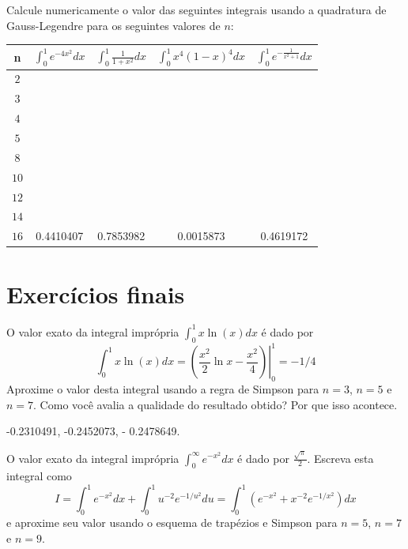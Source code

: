 \begin{Exercise}Calcule numericamente o valor das seguintes integrais usando a quadratura de Gauss-Legendre para os seguintes valores de $n$:
\begin{center}
\begin{tabular}{|c|c|c|c|c|}
\hline
n   & $\int_{0}^1e^{-4x^2}dx$ & $\int_{0}^1\frac{1}{1+x^2}dx$ & $\int_{0}^1x^4(1-x)^4dx$ & $\int_{0}^1e^{-\frac{1}{x^2+1}}dx$  \\
\hline
$2$ & ~\hspace{40pt}~& & ~\hspace{40pt}~& ~\hspace{40pt}~\\
\hline
$3$ && && \\
\hline
$4 $  & &      & & \\
\hline
$5 $  & &      & & \\
\hline
$8 $  & &   & &\\
\hline
$10$   & &  & &\\
\hline
$12$   & &  & &\\
\hline
$14$   & & & &\\
\hline
$16$   &0.4410407  &0.7853982 &0.0015873 & 0.4619172 \\
\hline
\end{tabular}
\end{center}
\end{Exercise}

\section*{Exercícios finais}

\begin{Exercise} O valor exato da integral imprópria $\int_0^1x\ln(x)dx$ é dado por
$$\int_0^1x\ln(x)dx=\left.\left(\frac{x^2}{2}\ln x-\frac{x^2}{4}\right)\right|_0^1=-1/4$$
Aproxime o valor desta integral usando a regra  de Simpson para $n=3$, $n=5$ e $n=7$. Como você avalia a qualidade do resultado obtido? Por que isso acontece.
\end{Exercise}


\begin{Answer}
  \begin{tiny}
-0.2310491, -0.2452073, - 0.2478649.    
  \end{tiny}
\end{Answer}


\begin{Exercise} O valor exato da integral imprópria $\int_0^\infty e^{-x^2}dx$ é dado por $\frac{\sqrt{\pi}}{2}$.
Escreva esta integral como
$$I=\int_0^1 e^{-x^2}dx+\int_0^1 u^{-2} e^{-1/u^2}du=\int_0^1 \left(e^{-x^2}+x^{-2}e^{-1/x^2}\right)dx$$
e aproxime seu valor usando o esquema de trapézios e Simpson para $n=5$, $n=7$ e $n=9$.
\end{Exercise}

